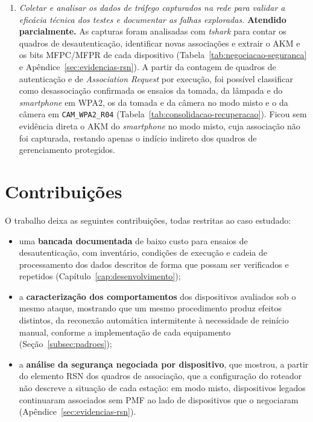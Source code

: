 \begin{enumerate}[label=\arabic*.]
    \item \textit{Coletar e analisar os dados de tráfego capturados na rede para validar a eficácia técnica dos testes e documentar as falhas exploradas.} \textbf{Atendido parcialmente.} As capturas foram analisadas com \textit{tshark} para contar os quadros de desautenticação, identificar novas associações e extrair o AKM e os bits MFPC/MFPR de cada dispositivo (Tabela~\ref{tab:negociacao-seguranca} e Apêndice~\ref{sec:evidencias-rsn}). A partir da contagem de quadros de autenticação e de \textit{Association Request} por execução, foi possível classificar como desassociação confirmada os ensaios da tomada, da lâmpada e do \textit{smartphone} em WPA2, os da tomada e da câmera no modo misto e o da câmera em \texttt{CAM\_\allowbreak{}WPA2\_\allowbreak{}R04} (Tabela~\ref{tab:consolidacao-recuperacao}). Ficou sem evidência direta o AKM do \textit{smartphone} no modo misto, cuja associação não foi capturada, restando apenas o indício indireto dos quadros de gerenciamento protegidos.
\end{enumerate}

\section{Contribuições}

O trabalho deixa as seguintes contribuições, todas restritas ao caso estudado:

\begin{itemize}
    \item uma \textbf{bancada documentada} de baixo custo para ensaios de desautenticação, com inventário, condições de execução e cadeia de processamento dos dados descritos de forma que possam ser verificados e repetidos (Capítulo~\ref{cap:desenvolvimento});
    \item a \textbf{caracterização dos comportamentos} dos dispositivos avaliados sob o mesmo ataque, mostrando que um mesmo procedimento produz efeitos distintos, da reconexão automática intermitente à necessidade de reinício manual, conforme a implementação de cada equipamento (Seção~\ref{subsec:padroes});
    \item a \textbf{análise da segurança negociada por dispositivo}, que mostrou, a partir do elemento RSN dos quadros de associação, que a configuração do roteador não descreve a situação de cada estação: em modo misto, dispositivos legados continuaram associados sem PMF ao lado de dispositivos que o negociaram (Apêndice~\ref{sec:evidencias-rsn}).
\end{itemize}

